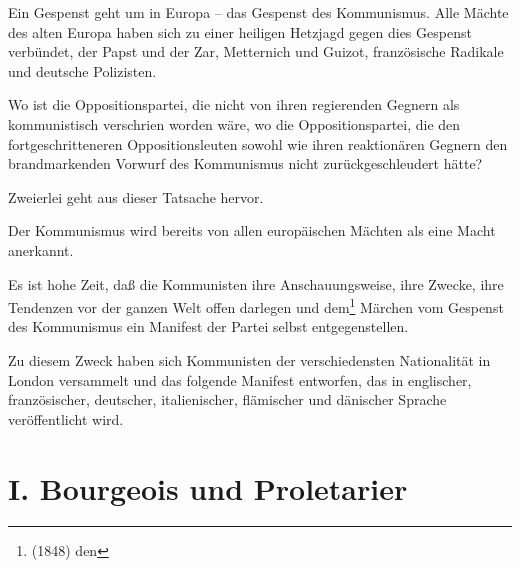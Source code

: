 \documentclass[letterpaper]{article}
\begin{document}
\newpage
\setcounter{page}{1}

\vspace*{4em}

Ein Gespenst geht um in Europa – das Gespenst des Kommunismus. Alle Mächte des alten Europa haben sich zu einer heiligen Hetzjagd gegen dies Gespenst verbündet, der Papst und der Zar, Metternich und Guizot, französische Radikale und deutsche Polizisten.

Wo ist die Oppositionspartei, die nicht von ihren regierenden Gegnern als kommunistisch verschrien worden wäre, wo die Oppositionspartei, die den fortgeschritteneren Oppositionsleuten sowohl wie ihren reaktionären Gegnern den brandmarkenden Vorwurf des Kommunismus nicht zurückgeschleudert hätte?

Zweierlei geht aus dieser Tatsache hervor.

Der Kommunismus wird bereits von allen europäischen Mächten als eine Macht anerkannt.

Es ist hohe Zeit, daß die Kommunisten ihre Anschauungsweise, ihre Zwecke, ihre Tendenzen vor der ganzen Welt offen darlegen und dem\footnote{(1848) den} Märchen vom Gespenst des Kommunismus ein Manifest der Partei selbst entgegenstellen.

Zu diesem Zweck haben sich Kommunisten der verschiedensten Nationalität in London versammelt und das folgende Manifest entworfen, das in englischer, französischer, deutscher, italienischer, flämischer und dänischer Sprache veröffentlicht wird.

\newpage

\section[I. Bourgeois und Proletarier]{I. Bourgeois und Proletarier\protect{}}
\end{document}
